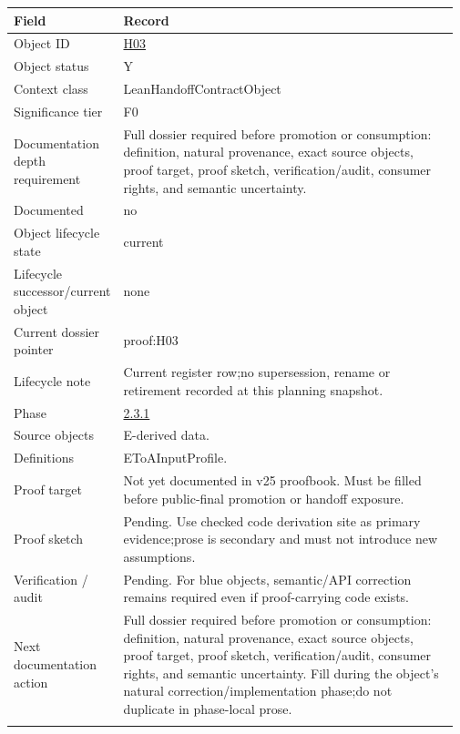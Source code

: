 \begin{longtable}{L{0.16\linewidth} L{0.81\linewidth}}
\hline
\textbf{Field} & \textbf{Record}\\
\hline
Object ID & \hyperlink{object-row-H03}{H03}\\
\hline\addlinespace[0.20em]
Object status & Y\\
\hline\addlinespace[0.20em]
Context class & LeanHandoffContractObject\\
\hline\addlinespace[0.20em]
Significance tier & F0\\
\hline\addlinespace[0.20em]
Documentation depth requirement & Full dossier required before promotion or consumption: definition, natural provenance, exact source objects, proof target, proof sketch, verification/\allowbreak{}audit, consumer rights, and semantic uncertainty.\\
\hline\addlinespace[0.20em]
Documented & no\\
\hline\addlinespace[0.20em]
Object lifecycle state & current\\
\hline\addlinespace[0.20em]
Lifecycle successor/\allowbreak{}current object & none\\
\hline\addlinespace[0.20em]
Current dossier pointer & proof:H03\\
\hline\addlinespace[0.20em]
Lifecycle note & Current register row;\newline no supersession, rename or retirement recorded at this planning snapshot.\\
\hline\addlinespace[0.20em]
Phase & \hyperlink{phase-row-2-3-1}{2.3.1}\\
\hline\addlinespace[0.20em]
Source objects & E-derived data.\\
\hline\addlinespace[0.20em]
Definitions & EToAInputProfile.\\
\hline\addlinespace[0.20em]
Proof target & Not yet documented in v25 proofbook. Must be filled before public-final promotion or handoff exposure.\\
\hline\addlinespace[0.20em]
Proof sketch & Pending. Use checked code derivation site as primary evidence;\newline prose is secondary and must not introduce new assumptions.\\
\hline\addlinespace[0.20em]
Verification /\allowbreak{} audit & Pending. For blue objects, semantic/\allowbreak{}API correction remains required even if proof-carrying code exists.\\
\hline\addlinespace[0.20em]
Next documentation action & Full dossier required before promotion or consumption: definition, natural provenance, exact source objects, proof target, proof sketch, verification/\allowbreak{}audit, consumer rights, and semantic uncertainty. Fill during the object's natural correction/\allowbreak{}implementation phase;\newline do not duplicate in phase-local prose.\\
\hline\addlinespace[0.20em]
\end{longtable}
